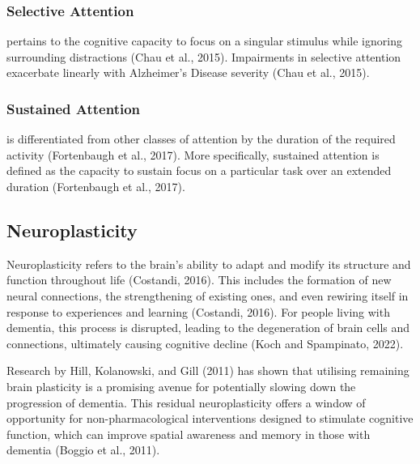 \documentclass{l4proj}
\begin{document}
\subsubsection{Selective Attention}
pertains to the cognitive capacity to focus on a singular stimulus while ignoring surrounding distractions (Chau et al., 2015). Impairments in selective attention exacerbate linearly with Alzheimer’s Disease severity (Chau et al., 2015).

\subsubsection{Sustained Attention} is differentiated from other classes of attention by the duration of the required activity (Fortenbaugh et al., 2017). More specifically, sustained attention is defined as the capacity to sustain focus on a particular task over an extended duration (Fortenbaugh et al., 2017).

\subsection{Neuroplasticity}\label{sec:neuroplasticity}
Neuroplasticity refers to the brain's ability to adapt and modify its structure and function throughout life (Costandi, 2016). This includes the formation of new neural connections, the strengthening of existing ones, and even rewiring itself in response to experiences and learning (Costandi, 2016). For people living with dementia, this process is disrupted, leading to the degeneration of brain cells and connections, ultimately causing cognitive decline (Koch and Spampinato, 2022).

Research by Hill, Kolanowski, and Gill (2011) has shown that utilising remaining brain plasticity is a promising avenue for potentially slowing down the progression of dementia. This residual neuroplasticity offers a window of opportunity for non-pharmacological interventions designed to stimulate cognitive function, which can improve spatial awareness and memory in those with dementia (Boggio et al., 2011).

\end{document}
